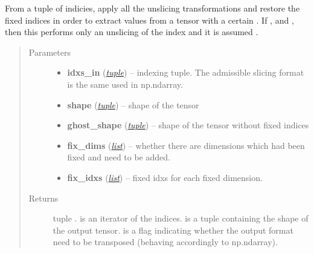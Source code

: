 \documentclass[a4paper,10pt,english]{sphinxmanual}
\begin{document}

\begin{fulllineitems}
\label{api-core:TensorToolbox.core.expand_idxs}
From a tuple of indicies, apply all the unslicing transformations and restore the fixed indices in order to extract values from a tensor with a certain . If ,  and , then this performs only an unslicing of the index and it is assumed .
\begin{quote}\begin{description}
\item[{Parameters}] \leavevmode\begin{itemize}
\item {} 
\textbf{idxs\_in} (\href{http://docs.python.org/library/functions.html\#tuple}{\emph{tuple}}) -- indexing tuple. The admissible slicing format is the same used in np.ndarray.

\item {} 
\textbf{shape} (\href{http://docs.python.org/library/functions.html\#tuple}{\emph{tuple}}) -- shape of the tensor

\item {} 
\textbf{ghost\_shape} (\href{http://docs.python.org/library/functions.html\#tuple}{\emph{tuple}}) -- shape of the tensor without fixed indices

\item {} 
\textbf{fix\_dims} (\href{http://docs.python.org/library/functions.html\#list}{\emph{list}}) -- whether there are dimensions which had been fixed and need to be added.

\item {} 
\textbf{fix\_idxs} (\href{http://docs.python.org/library/functions.html\#list}{\emph{list}}) -- fixed idxs for each fixed dimension.

\end{itemize}

\item[{Returns}] \leavevmode
tuple .  is an iterator of the indices.  is a tuple containing the shape of the output tensor.  is a flag indicating whether the output format need to be transposed (behaving accordingly to np.ndarray).

\end{description}\end{quote}

\end{fulllineitems}
\end{document}
